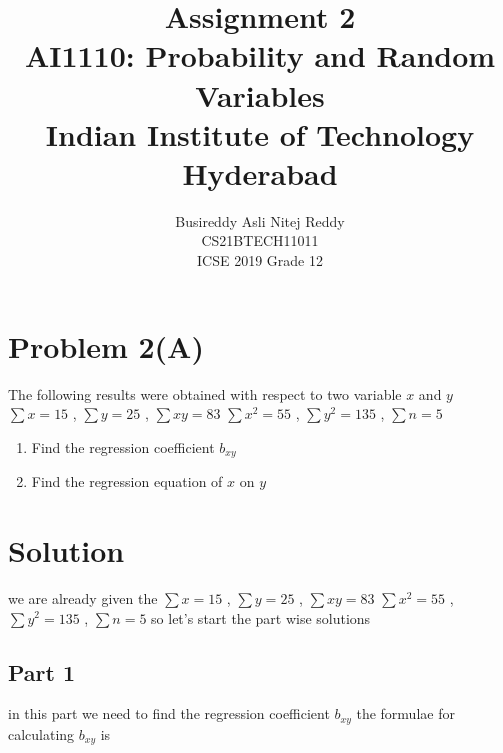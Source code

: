 \documentclass[journal,12pt,twocolumn]{IEEEtran}
\begin{document}
\graphicspath{{figures/}}

\title{Assignment 2 \\ \Large AI1110: Probability and Random Variables \\ \large Indian Institute of Technology Hyderabad}
\author{Busireddy Asli Nitej Reddy\\ \normalsize CS21BTECH11011  \\ \Large ICSE 2019 Grade 12}
\date{}
\maketitle


\begin{flushleft}

\section*{\textbf{Problem 2(A)}}
The following results were obtained with respect to two variable $x$ and $y$
       \newline
       $\sum x = 15$ , $\sum y = 25$ , $\sum xy = 83$
       \newline
       $\sum x^{2} = 55$ , $\sum y^{2} = 135$ , $\sum n = 5$
       
      \begin{enumerate}
         \item Find the regression coefficient $b_{xy}$
         \item Find the regression equation of $x$ on $y$
      \end{enumerate}



\section*{\textbf{Solution}}
   we are already given the 
       \newline
          $\sum x = 15$ , $\sum y = 25$ , $\sum xy = 83$
      \newline
          $\sum x^{2} = 55$ , $\sum y^{2} = 135$ , $\sum n = 5$
      \newline
   so let's start the part wise solutions
  
  
  
\subsection*{\textbf{Part 1}}
   in this part we need to find the regression coefficient $b_{xy}$
   \newline
   the formulae for calculating $b_{xy}$ is
   

\end{flushleft}
\end{document}

